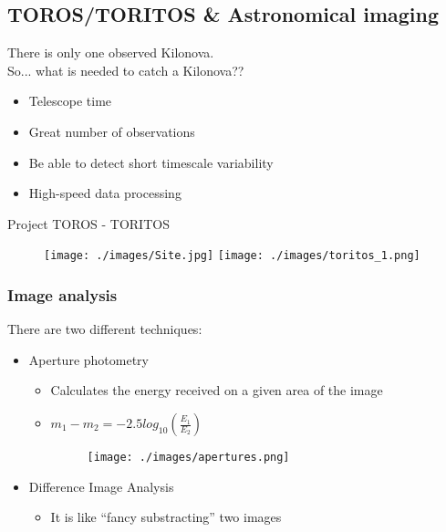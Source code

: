 \documentclass[10pt]{beamer}
\begin{document}
\subsection{TOROS/TORITOS \& Astronomical imaging}
\begin{frame}
 There is only one observed Kilonova.\\ 
 \pause
 So... what is needed to catch a Kilonova??
 \begin{itemize}[<+->]
  \item Telescope time
  \item Great number of observations
  \item Be able to detect short timescale variability
  \item High-speed data processing 
 \end{itemize}
 \pause
 Project TOROS - TORITOS
\begin{figure}
 \centering
 \texttt{[image: ./images/Site.jpg]}
 \texttt{[image: ./images/toritos\_1.png]}
\end{figure}
\end{frame}
\begin{frame}\frametitle{Image analysis}
There are two different techniques:
\begin{itemize}
 \item Aperture photometry \pause
 \begin{itemize}
  \item Calculates the energy received on a given area of the image %
  \item $m_1 - m_2 = -2.5 log_{10}\left(\frac{E_1}{E_2}\right)$ %
\begin{figure}
  \begin{center}
 \texttt{[image: ./images/apertures.png]}
\end{center}
\end{figure}
 \end{itemize}
 \item Difference Image Analysis \pause
 \begin{itemize}
  \item It is like ``fancy substracting'' two images%
 \end{itemize}
\end{itemize}
\end{frame}
\end{document}
